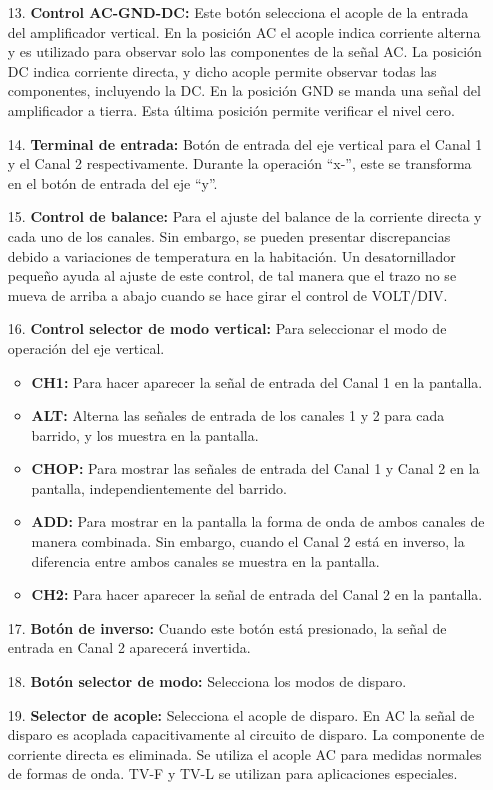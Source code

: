 \documentclass{report}
\begin{document}
\begin{itemize}
\item[13.] \textbf{Control AC-GND-DC:} Este botón selecciona el acople de la entrada del amplificador vertical. En la posición AC el acople indica corriente alterna y es utilizado para observar solo las componentes de la señal AC. La posición DC indica corriente directa, y dicho acople permite observar todas las componentes, incluyendo la DC. En la posición GND se manda una señal del amplificador a tierra. Esta última posición permite verificar el nivel cero.
\item[14.] \textbf{Terminal de entrada:} Botón de entrada del eje vertical para el Canal 1 y el Canal 2 respectivamente. Durante la operación ``x-'', este se transforma en el botón de entrada del eje ``y''.
\item[15.] \textbf{Control de balance:} Para el ajuste del balance de la corriente directa y cada uno de los canales. Sin embargo, se pueden presentar discrepancias debido a variaciones de temperatura en la habitación. Un desatornillador pequeño ayuda al ajuste de este control, de tal manera que el trazo no se mueva de arriba a abajo cuando se hace girar el control de VOLT/DIV.
\item[16.] \textbf{Control selector de modo vertical:} Para seleccionar el modo de operación del eje vertical.
\begin{itemize}
\item \textbf{CH1:} Para hacer aparecer la señal de entrada del Canal 1 en la
pantalla.
\item \textbf{ALT:} Alterna las señales de entrada de los canales 1 y 2 para cada barrido, y los muestra en la pantalla.
\item \textbf{CHOP:} Para mostrar las señales de entrada del Canal 1 y Canal 2 en la pantalla, independientemente del barrido.
\item \textbf{ADD:} Para mostrar en la pantalla la forma de onda de ambos canales de manera combinada. Sin embargo, cuando el Canal 2 está en inverso, la diferencia entre ambos canales se muestra en la pantalla.
\item \textbf{CH2:} Para hacer aparecer la señal de entrada del Canal 2 en la
pantalla.
\end{itemize}
\item[17.] \textbf{Botón de inverso:} Cuando este botón está presionado, la señal de entrada en Canal 2 aparecerá invertida.
\item[18.] \textbf{Botón selector de modo:} Selecciona los modos de disparo.
\item[19.] \textbf{Selector de acople:} Selecciona el acople de disparo. En AC la señal de disparo es acoplada capacitivamente al circuito de disparo. La componente de corriente directa es eliminada. Se utiliza el acople AC para medidas normales de formas de onda. TV-F y TV-L se utilizan para aplicaciones especiales.

\end{itemize}
\end{document}

